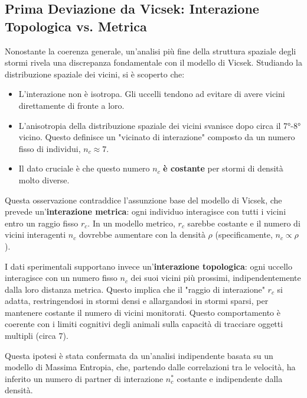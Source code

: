 \subsection{Prima Deviazione da Vicsek: Interazione Topologica vs. Metrica}
Nonostante la coerenza generale, un'analisi più fine della struttura spaziale degli stormi rivela una discrepanza fondamentale con il modello di Vicsek. Studiando la distribuzione spaziale dei vicini, si è scoperto che:
\begin{itemize}
    \item L'interazione non è isotropa. Gli uccelli tendono ad evitare di avere vicini direttamente di fronte a loro.
    \item L'anisotropia della distribuzione spaziale dei vicini svanisce dopo circa il 7°-8° vicino. Questo definisce un "vicinato di interazione" composto da un numero fisso di individui, $n_c \approx 7$.
    \item Il dato cruciale è che questo numero $n_c$ \textbf{è costante} per stormi di densità molto diverse.
\end{itemize}
Questa osservazione contraddice l'assunzione base del modello di Vicsek, che prevede un'\textbf{interazione metrica}: ogni individuo interagisce con tutti i vicini entro un raggio fisso $r_c$. In un modello metrico, $r_c$ sarebbe costante e il numero di vicini interagenti $n_c$ dovrebbe aumentare con la densità $\rho$ (specificamente, $n_c \propto \rho$).

I dati sperimentali supportano invece un'\textbf{interazione topologica}: ogni uccello interagisce con un numero fisso $n_c$ dei suoi vicini più prossimi, indipendentemente dalla loro distanza metrica. Questo implica che il "raggio di interazione" $r_c$ si adatta, restringendosi in stormi densi e allargandosi in stormi sparsi, per mantenere costante il numero di vicini monitorati. Questo comportamento è coerente con i limiti cognitivi degli animali sulla capacità di tracciare oggetti multipli (circa 7).

Questa ipotesi è stata confermata da un'analisi indipendente basata su un modello di Massima Entropia, che, partendo dalle correlazioni tra le velocità, ha inferito un numero di partner di interazione $n_c^*$ costante e indipendente dalla densità.

